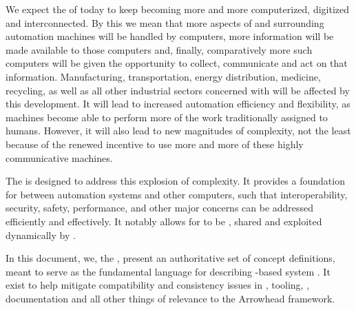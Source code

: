 %
%

We expect the  of today to keep becoming more and more computerized, digitized and interconnected.
By this we mean that more aspects of and surrounding automation machines will be handled by computers, more information will be made available to those computers and, finally, comparatively more such computers will be given the opportunity to collect, communicate and act on that information.
Manufacturing, transportation, energy distribution, medicine, recycling, as well as all other industrial sectors concerned with  will be affected by this development.
It will lead to increased automation efficiency and flexibility, as machines become able to perform more of the work traditionally assigned to humans.
However, it will also lead to new magnitudes of complexity, not the least because of the renewed incentive to use more and more of these highly communicative machines.

The  is designed to address this explosion of complexity.
It provides a foundation for  \cite{mackenzie2006reference} between automation systems and other computers, such that interoperability, security, safety, performance, and other major concerns can be addressed efficiently and effectively.
It notably allows for   to be , shared and exploited dynamically by  .

In this document, we, the , present an authoritative set of concept definitions, meant to serve as the fundamental language for describing -based system .
It exist to help mitigate compatibility and consistency issues in , tooling, , documentation and all other things of relevance to the Arrowhead framework.

